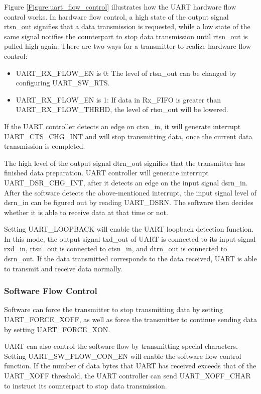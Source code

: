 \documentclass[main\_\_EN.tex]{subfiles}
\begin{document}
Figure \ref{Figure:uart_flow_control} illustrates how the UART hardware flow control works. In hardware flow control, a high state of the output signal rtsn\_out signifies that a data transmission is requested, while a low state of the same signal notifies the counterpart to stop data transmission until rtsn\_out is pulled high again. There are two ways for a transmitter to realize hardware flow control:

\begin{itemize}
    \item UART\_RX\_FLOW\_EN is 0: The level of rtsn\_out can be changed by configuring UART\_SW\_RTS.
    \item UART\_RX\_FLOW\_EN is 1: If data in Rx\_FIFO is greater than UART\_RX\_FLOW\_THRHD, the level of rtsn\_out will be lowered.
\end{itemize}

If the UART controller detects an edge on ctsn\_in, it will generate interrupt UART\_CTS\_CHG\_INT and will stop transmitting data, once the current data transmission is completed.

The high level of the output signal dtrn\_out signifies that the transmitter has finished data preparation. UART controller  will generate interrupt UART\_DSR\_CHG\_INT, after it detects an edge on the input signal dsrn\_in. After the software detects the above-mentioned interrupt, the input signal level of dsrn\_in can be figured out by reading UART\_DSRN. The software then decides whether it is able to receive data at that time or not.

Setting UART\_LOOPBACK will enable the UART loopback detection function. In this mode, the output signal txd\_out of UART is connected to its input signal rxd\_in, rtsn\_out is connected to ctsn\_in, and dtrn\_out is connected to dsrn\_out. If the data transmitted corresponds to the data received, UART is able to transmit and receive data normally.

\subsubsection{Software Flow Control}

Software can force the transmitter to stop transmitting data by setting UART\_FORCE\_XOFF, as well as force the transmitter to continue sending data by setting UART\_FORCE\_XON.

UART can also control the software flow by transmitting special characters. Setting UART\_SW\_FLOW\_CON\_EN  will enable the software flow control function. If the number of data bytes that UART has received exceeds that of the UART\_XOFF threshold, the UART controller can send UART\_XOFF\_CHAR to instruct its counterpart to stop data transmission.
\end{document}
